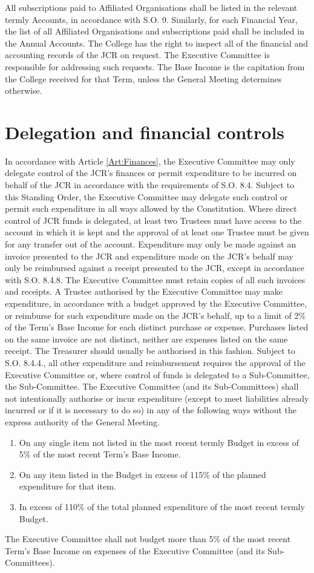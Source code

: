 \npara All subscriptions paid to Affiliated Organisations shall be listed in the relevant termly Accounts, in accordance with S.O. 9.  Similarly, for each Financial Year, the list of all Affiliated Organisations and subscriptions paid shall be included in the Annual Accounts.
\npara The College has the right to inspect all of the financial and accounting records of the JCR on request. The Executive Committee is responsible for addressing such requests.
\npara The Base Income is the capitation from the College received for that Term, unless the General Meeting determines otherwise.
\section{Delegation and financial controls}
\npara In accordance with Article \ref{Art:Finances}, the Executive Committee may only delegate control of the JCR's finances or permit expenditure to be incurred on behalf of the JCR in accordance with the requirements of S.O. 8.4.  Subject to this Standing Order, the Executive Committee may delegate such control or permit such expenditure in all ways allowed by the Constitution.
\npara Where direct control of JCR funds is delegated, at least two Trustees must have access to the account in which it is kept and the approval of at least one Trustee must be given for any transfer out of the account.
\npara Expenditure may only be made against an invoice presented to the JCR and expenditure made on the JCR's behalf may only be reimbursed against a receipt presented to the JCR, except in accordance with S.O. 8.4.8.  The Executive Committee must retain copies of all such invoices and receipts.
\npara A Trustee authorised by the Executive Committee may make expenditure, in accordance with a budget approved by the Executive Committee, or reimburse for such expenditure made on the JCR's behalf, up to a limit of 2\% of the Term's Base Income for each distinct purchase or expense.  Purchases listed on the same invoice are not distinct, neither are expenses listed on the same receipt.  The Treasurer should usually be authorised in this fashion.
\npara Subject to S.O. 8.4.4., all other expenditure and reimbursement requires the approval of the Executive Committee or, where control of funds is delegated to a Sub-Committee, the Sub-Committee.
\npara The Executive Committee (and its Sub-Committees) shall not intentionally authorise or incur expenditure (except to meet liabilities already incurred or if it is necessary to do so) in any of the following ways without the express authority of the General Meeting.
\begin{enumerate}
\item On any single item not listed in the most recent termly Budget in excess of 5\% of the most recent Term's Base Income.
\item On any item listed in the Budget in excess of 115\% of the planned expenditure for that item.
\item In excess of 110\% of the total planned expenditure of the most recent termly Budget.
\end{enumerate}
\npara The Executive Committee shall not budget more than 5\% of the most recent Term's Base Income on expenses of the Executive Committee (and its Sub-Committees).

